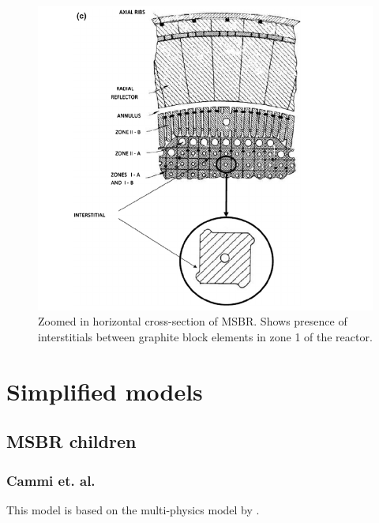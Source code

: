 \documentclass{article}
\begin{document}
\begin{figure}[htpb]
  \centering
  \includegraphics{zoomed_horizontal_MSBR_cross_section.png}
  \caption{Zoomed in horizontal cross-section of MSBR. Shows presence of
    interstitials between graphite block elements in zone 1 of the reactor.}
  \label{fig:zoom_horiz}
\end{figure}

\section{Simplified models}
\subsection{MSBR children}
\subsubsection{Cammi et. al.}
This model is based on the multi-physics model by \cite{cammi2011multi}.



\end{document}
